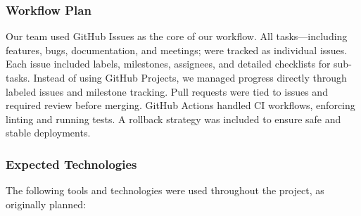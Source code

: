 \documentclass{article}
\begin{document}
\subsubsection{Workflow Plan}

Our team used GitHub Issues as the core of our workflow. All tasks—including features, bugs, documentation, and meetings; were tracked as individual issues. 
Each issue included labels, milestones, assignees, and detailed checklists for sub-tasks. Instead of using GitHub Projects, we managed progress directly through labeled issues and milestone tracking. Pull requests were tied to issues and required review before merging. GitHub Actions handled CI workflows, enforcing linting and running tests. A rollback strategy was included to ensure safe and stable deployments.

\subsubsection{Expected Technologies}

The following tools and technologies were used throughout the project, as originally planned:
\end{document}
